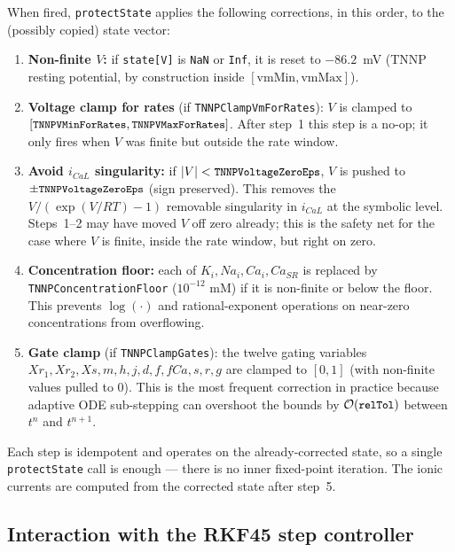 \documentclass[11pt,a4paper]{article}
\newcommand{\code}[1]{\texttt{\small #1}}
\begin{document}
When fired, \code{protectState} applies the following corrections, in
this order, to the (possibly copied) state vector:

\begin{enumerate}
\item \textbf{Non-finite $V$:} if \code{state[V]} is \code{NaN} or
\code{Inf}, it is reset to $-86.2$~mV (TNNP resting potential, by
construction inside $[\text{vmMin}, \text{vmMax}]$).
\item \textbf{Voltage clamp for rates} (if \code{TNNPClampVmForRates}):
$V$ is clamped to $[\code{TNNPVMinForRates},\code{TNNPVMaxForRates}]$.
After step~1 this step is a no-op; it only fires when $V$ was finite
but outside the rate window.
\item \textbf{Avoid $i_{CaL}$ singularity:} if $|V| <
\code{TNNPVoltageZeroEps}$, $V$ is pushed to $\pm\code{TNNPVoltageZeroEps}$
(sign preserved). This removes the $V/(\exp(V/RT)-1)$ removable
singularity in $i_{CaL}$ at the symbolic level. Steps~1--2 may have
moved $V$ off zero already; this is the safety net for the case where
$V$ is finite, inside the rate window, but right on zero.
\item \textbf{Concentration floor:} each of
$K_{i}, Na_{i}, Ca_{i}, Ca_{SR}$ is replaced by
\code{TNNPConcentrationFloor} ($10^{-12}$ mM) if it is non-finite or
below the floor. This prevents $\log(\cdot)$ and rational-exponent
operations on near-zero concentrations from overflowing.
\item \textbf{Gate clamp} (if \code{TNNPClampGates}): the twelve gating
variables $Xr_{1}, Xr_{2}, Xs, m, h, j, d, f, fCa, s, r, g$ are
clamped to $[0, 1]$ (with non-finite values pulled to $0$). This is
the most frequent correction in practice because adaptive ODE
sub-stepping can overshoot the bounds by $\mathcal{O}(\code{relTol})$
between $t^{n}$ and $t^{n+1}$.
\end{enumerate}

Each step is idempotent and operates on the already-corrected state,
so a single \code{protectState} call is enough — there is no inner
fixed-point iteration. The ionic currents are computed from the
corrected state after step~5.

\subsection{Interaction with the RKF45 step controller}
\label{sec:tnnp:rkf45}
\end{document}
